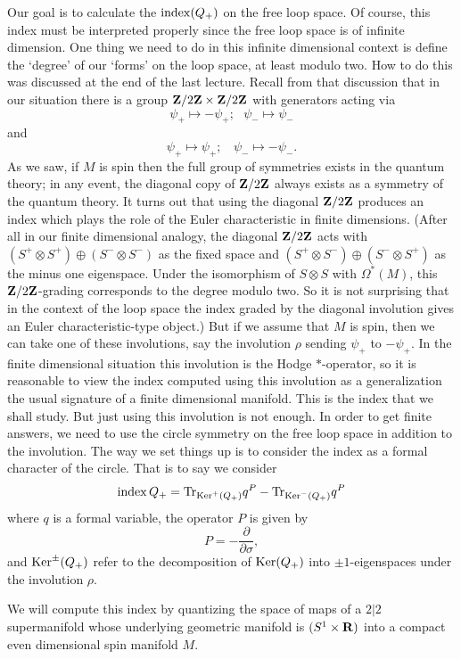 Our goal is to calculate the ${\rm index}(Q_+)$ 
on the free loop space. Of course, this index
must be interpreted properly since the free loop space is of infinite
dimension.
One thing we need to do in this infinite dimensional context is define
the `degree' of our `forms' on the loop space, at least modulo two.
How to do this was  discussed at the end of the last lecture.
Recall from that discussion that in  our
situation there is a group ${\bf Z}/2{\bf Z}\times {\bf Z}/2{\bf 
Z}$ with generators acting via
$$\psi_+\mapsto -\psi_+;\ \ \ \psi_-\mapsto\psi_-$$
and
$$\psi_+\mapsto \psi_+;\ \ \ \ \psi_-\mapsto-\psi_-.$$
As we saw, if $M$ is spin then the full group of symmetries exists in
the quantum theory; in any event,
 the diagonal copy of ${\bf Z}/2{\bf Z}$ always
exists as a symmetry of the quantum theory.
It turns out that using the diagonal ${\bf Z}/2{\bf Z}$ produces an
index which plays the role of the Euler characteristic in finite
dimensions. (After all in our finite dimensional analogy, the
diagonal  ${\bf Z}/2{\bf Z}$ acts with $(S^+\otimes S^+)\oplus
(S^-\otimes S^-)$ as the fixed space and $(S^+\otimes S^-)\oplus
(S^-\otimes S^+)$ as the minus one eigenspace. Under the isomorphism of
$S\otimes S$ with $\Omega^*(M)$, this ${\bf Z}/2{\bf
Z}$-grading corresponds to the degree modulo two.
So it is not surprising that in the context of the loop space the
index graded by the diagonal involution gives an Euler
characteristic-type object.)
But if we 
 assume that $M$ is spin, then we can
take  one of these involutions, say the
involution $\rho$ sending $\psi_+$ to $-\psi_+$. In the finite dimensional
situation this involution is the Hodge $*$-operator, so it is
reasonable to view the
index computed using this involution as a generalization the usual
signature of a finite dimensional manifold.
This is the index that we shall study.
But just using this involution is not enough.
In order to get finite answers, we need to use the circle symmetry on
the free loop space in addition to the involution.
The way we set things up is to consider the index as a formal
character of the circle. That is to say we consider
$${\rm index}\,Q_+={\rm Tr}_{{\rm Ker}^+(Q_+)}q^P-{\rm Tr}_{{\rm
Ker}^-(Q_+)}q^P$$ 
where $q$ is a formal variable, the operator $P$ is given by
$$P=-\frac{\partial}{\partial\sigma},$$
and ${\rm Ker}^\pm(Q_+)$ refer to the 
decomposition of ${\rm Ker}(Q_+)$ into  $\pm 1$-eigenspaces under the
involution $\rho$.


We will compute this index by
quantizing the space of  maps of a $2|2$
supermanifold whose underlying geometric manifold is $(S^1\times {\bf
R})$ into a compact even dimensional spin manifold $M$.


